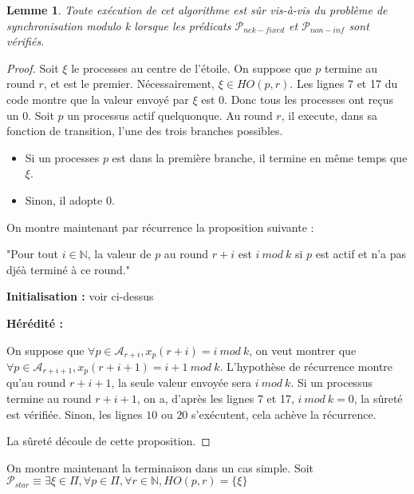 \documentclass{article}
\newtheorem{lemma}{Lemme}
\begin{document}
\begin{lemma}
	Toute exécution de cet algorithme est sûr vis-à-vis du problème de synchronisation modulo k lorsque les prédicats $\mathcal{P}_{nek-fixed}$ et $\mathcal{P}_{non-inf}$ sont vérifiés.
\end{lemma}
\begin{proof}

	Soit $\xi$ le processes au centre de l'étoile.
	On suppose que $p$ termine au round $r$, et est le premier. Nécessairement, $\xi \in HO(p,r)$.
	Les lignes 7 et 17 du code montre que la valeur envoyé par $\xi$ est $0$.
	Donc tous les processes ont reçus un $0$. Soit $p$ un processus actif quelquonque. Au round $r$, il execute, dans sa fonction de transition, l'une des trois branches possibles.
	\begin{itemize}

		\item Si un processes $p$ est dans la première branche, il termine en même temps que $\xi$.
		\item Sinon, il adopte $0$.

	\end{itemize}

	On montre maintenant par récurrence la proposition suivante :

	"Pour tout $i \in \mathds{N}$, la valeur de $p$ au round $r+i$ est $i~mod~k$ si $p$ est actif et n'a pas djéà terminé à ce round."

	\textbf{Initialisation : } voir ci-dessus

	\textbf{Hérédité :}

	On suppose que $\forall p \in \mathcal{A}_{r+i}, x_p(r+i) = i~mod~k$, on veut montrer que $\forall p \in \mathcal{A}_{r+i+1}, x_p(r+i+1) = i+1~mod~k$.
	L'hypothèse de récurrence montre qu'au round $r+i+1$, la seule valeur envoyée sera $i~mod~k$.
	Si un processus termine au round $r+i+1$, on a, d'après les lignes 7 et 17, $i~mod~k = 0$, la sûreté est vérifiée.
	Sinon, les lignes $10$ ou $20$ s'exécutent, cela achève la récurrence.

	La sûreté découle de cette proposition.

\end{proof}

On montre maintenant la terminaison dans un cas simple.
Soit $\mathcal{P}_{star} \equiv \exists \xi \in \Pi, \forall p \in \Pi, \forall r \in \mathds{N}, HO(p, r) = \{\xi\}$
\end{document}

